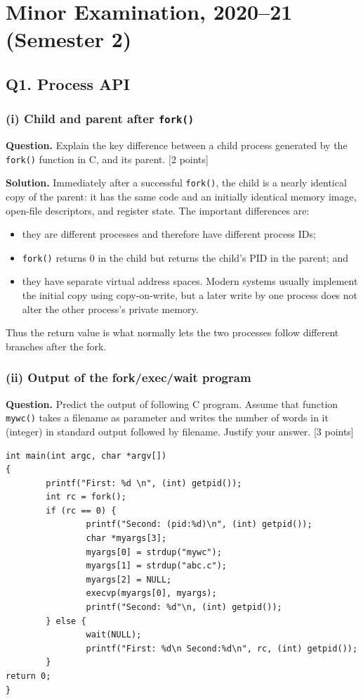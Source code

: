 \section{Minor Examination, 2020--21 (Semester 2)}

\subsection*{Q1. Process API}

\subsubsection*{(i) Child and parent after \texttt{fork()}}
\textbf{Question.} Explain the key difference between a child process generated
by the \texttt{fork()} function in C, and its parent. \hfill [2 points]

\textbf{Solution.}
Immediately after a successful \texttt{fork()}, the child is a nearly identical
copy of the parent: it has the same code and an initially identical memory
image, open-file descriptors, and register state.  The important differences
are:
\begin{itemize}
  \item they are different processes and therefore have different process IDs;
  \item \texttt{fork()} returns \(0\) in the child but returns the child's PID
        in the parent; and
  \item they have separate virtual address spaces.  Modern systems usually
        implement the initial copy using copy-on-write, but a later write by
        one process does not alter the other process's private memory.
\end{itemize}
Thus the return value is what normally lets the two processes follow different
branches after the fork.

\subsubsection*{(ii) Output of the fork/exec/wait program}
\textbf{Question.} Predict the output of following C program. Assume that
function \texttt{mywc()} takes a filename as parameter and writes the number of
words in it (integer) in standard output followed by filename. Justify your
answer. \hfill [3 points]
\begin{verbatim}
int main(int argc, char *argv[])
{
        printf("First: %d \n", (int) getpid());
        int rc = fork();
        if (rc == 0) {
                printf("Second: (pid:%d)\n", (int) getpid());
                char *myargs[3];
                myargs[0] = strdup("mywc");
                myargs[1] = strdup("abc.c");
                myargs[2] = NULL;
                execvp(myargs[0], myargs);
                printf("Second: %d"\n, (int) getpid());
        } else {
                wait(NULL);
                printf("First: %d\n Second:%d\n", rc, (int) getpid());
        }
return 0;
}
\end{verbatim}


